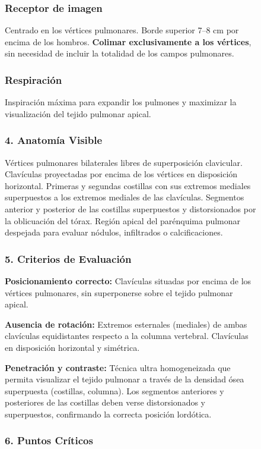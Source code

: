 \begin{figure}
{\subsubsection*{Receptor de imagen}
Centrado en los vértices pulmonares. Borde superior 7--8 cm por encima de los hombros. \textbf{Colimar exclusivamente a los vértices}, sin necesidad de incluir la totalidad de los campos pulmonares.

\subsubsection*{Respiración}
Inspiración máxima para expandir los pulmones y maximizar la visualización del tejido pulmonar apical.

\subsubsection*{4. Anatomía Visible}

Vértices pulmonares bilaterales libres de superposición clavicular. Clavículas proyectadas por encima de los vértices en disposición horizontal. Primeras y segundas costillas con sus extremos mediales superpuestos a los extremos mediales de las clavículas. Segmentos anterior y posterior de las costillas superpuestos y distorsionados por la oblicuación del tórax. Región apical del parénquima pulmonar despejada para evaluar nódulos, infiltrados o calcificaciones.

\subsubsection*{5. Criterios de Evaluación}

\textbf{Posicionamiento correcto:} Clavículas situadas por encima de los vértices pulmonares, sin superponerse sobre el tejido pulmonar apical.

\textbf{Ausencia de rotación:} Extremos esternales (mediales) de ambas clavículas equidistantes respecto a la columna vertebral. Clavículas en disposición horizontal y simétrica.

\textbf{Penetración y contraste:} Técnica ultra homogeneizada que permita visualizar el tejido pulmonar a través de la densidad ósea superpuesta (costillas, columna). Los segmentos anteriores y posteriores de las costillas deben verse distorsionados y superpuestos, confirmando la correcta posición lordótica.

\subsubsection*{6. Puntos Críticos}

}
\end{figure}
